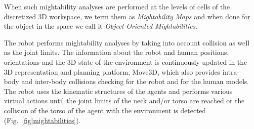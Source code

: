 \documentclass{svmult}
\begin{document}
When such mightability analyses are performed at the levels of cells of the
discretized 3D workspace, we term them as \emph{Mightability Maps} and when done
for the object in the space we call it \emph{Object Oriented Mightabilities}.

The robot performs mightability analyses by taking into account collision as
well as the joint limits. The information about the robot and human positions,
orientations and the 3D state of the environment is continuously updated in the
3D representation and planning platform, Move3D, which also
provides intra-body and inter-body collisions checking for the robot and for
the human models. The robot uses the kinematic structures of the agents and
performs various virtual actions until the joint limits of the neck and/or
torso are reached or the collision of the torso of the agent with the
environment is detected (Fig.~\ref{fig|mightabilities}).
\end{document}
